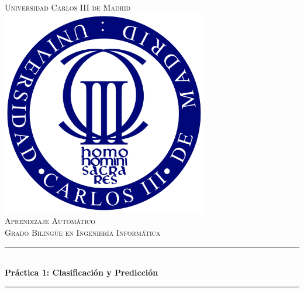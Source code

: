 \documentclass[12pt]{article}
\begin{document}
\begin{titlepage}

\newcommand{\HRule}{\rule{\linewidth}{0.5mm}} %

\center %


\textsc{\LARGE Universidad Carlos III de Madrid}\\[1.2cm] %

\includegraphics[width=9cm]{Logo}\\[1.2cm] %

\textsc{\Large Aprendizaje Automático}\\[0.5cm] %
\textsc{\large Grado Bilingüe en Ingeniería Informática}\\[1.5cm] %


\HRule \\[0.7cm]
{ \huge \bfseries Práctica 1: Clasificación y Predicción}\\[0.4cm] %
\HRule \\[1.5cm]


\end{titlepage}
\end{document}
